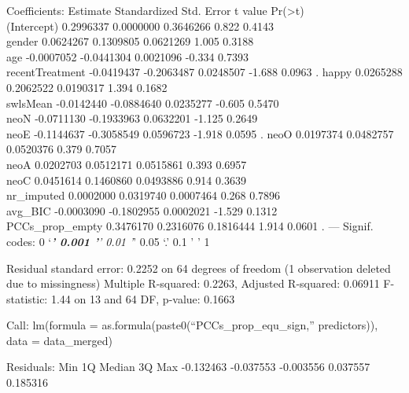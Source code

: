 \documentclass[
  english,
  man]{apa6}
\begin{document}
Coefficients:
Estimate Standardized Std. Error t value Pr(\textgreater\textbar t\textbar)\\
(Intercept) 0.2996337 0.0000000 0.3646266 0.822 0.4143\\
gender 0.0624267 0.1309805 0.0621269 1.005 0.3188\\
age -0.0007052 -0.0441304 0.0021096 -0.334 0.7393\\
recentTreatment -0.0419437 -0.2063487 0.0248507 -1.688 0.0963 .
happy 0.0265288 0.2062522 0.0190317 1.394 0.1682\\
swlsMean -0.0142440 -0.0884640 0.0235277 -0.605 0.5470\\
neoN -0.0711130 -0.1933963 0.0632201 -1.125 0.2649\\
neoE -0.1144637 -0.3058549 0.0596723 -1.918 0.0595 .
neoO 0.0197374 0.0482757 0.0520376 0.379 0.7057\\
neoA 0.0202703 0.0512171 0.0515861 0.393 0.6957\\
neoC 0.0451614 0.1460860 0.0493886 0.914 0.3639\\
nr\_imputed 0.0002000 0.0319740 0.0007464 0.268 0.7896\\
avg\_BIC -0.0003090 -0.1802955 0.0002021 -1.529 0.1312\\
PCCs\_prop\_empty 0.3476170 0.2316076 0.1816444 1.914 0.0601 .
---
Signif. codes: 0 `\emph{\textbf{' 0.001 '}' 0.01 '}' 0.05 `.' 0.1 ' ' 1

Residual standard error: 0.2252 on 64 degrees of freedom
(1 observation deleted due to missingness)
Multiple R-squared: 0.2263, Adjusted R-squared: 0.06911
F-statistic: 1.44 on 13 and 64 DF, p-value: 0.1663

Call:
lm(formula = as.formula(paste0(``PCCs\_prop\_equ\_sign,'' predictors)),
data = data\_merged)

Residuals:
Min 1Q Median 3Q Max
-0.132463 -0.037553 -0.003556 0.037557 0.185316
\end{document}
